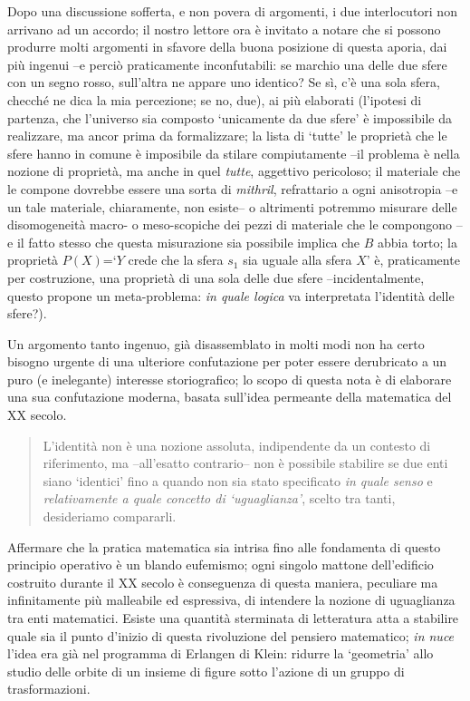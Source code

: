 Dopo una discussione sofferta, e non povera di argomenti, i due interlocutori non arrivano ad un accordo; il nostro lettore ora è invitato a notare che si possono produrre molti argomenti in sfavore della buona posizione di questa aporia, dai più ingenui --e perciò praticamente inconfutabili: se marchio una delle due sfere con un segno rosso, sull'altra ne appare uno identico? Se sì, c'è una sola sfera, checché ne dica la mia percezione; se no, due), ai più elaborati (l'ipotesi di partenza, che l'universo sia composto `unicamente da due sfere' è impossibile da realizzare, ma ancor prima da formalizzare; la lista di `tutte' le proprietà che le sfere hanno in comune è imposibile da stilare compiutamente --il problema è nella nozione di proprietà, ma anche in quel \emph{tutte}, aggettivo pericoloso; il materiale che le compone dovrebbe essere una sorta di \emph{mithril}, refrattario a ogni anisotropia --e un tale materiale, chiaramente, non esiste-- o altrimenti potremmo misurare delle disomogeneità macro- o meso-scopiche dei pezzi di materiale che le compongono --e il fatto stesso che questa misurazione sia possibile implica che $B$ abbia torto; la proprietà $P(X)$=`$Y$ crede che la sfera $s_1$ sia uguale alla sfera $X$' è, praticamente per costruzione, una proprietà di una sola delle due sfere --incidentalmente, questo propone un meta-problema: \emph{in quale logica} va interpretata l'identità delle sfere?).

Un argomento tanto ingenuo, già disassemblato in molti modi \cite{foobar,baz} non ha certo bisogno urgente di una ulteriore confutazione per poter essere derubricato a un puro (e inelegante) interesse storiografico; lo scopo di questa nota è di elaborare una sua confutazione moderna, basata sull'idea permeante della matematica del XX secolo.
\begin{quote}
  L'identità non è una nozione assoluta, indipendente da un contesto di riferimento, ma --all'esatto contrario-- non è possibile stabilire se due enti siano `identici' fino a quando non sia stato specificato \emph{in quale senso} e \emph{relativamente a quale concetto di `uguaglianza'}, scelto tra tanti, desideriamo compararli.
\end{quote}
Affermare che la pratica matematica sia intrisa fino alle fondamenta di questo principio operativo è un blando eufemismo; ogni singolo mattone dell'edificio costruito durante il XX secolo è conseguenza di questa maniera, peculiare ma infinitamente più malleabile ed espressiva, di intendere la nozione di uguaglianza tra enti matematici. Esiste una quantità sterminata di letteratura atta a stabilire quale sia il punto d'inizio di questa rivoluzione del pensiero matematico; \emph{in nuce} l'idea era già nel programma di Erlangen di Klein: ridurre la `geometria' allo studio delle orbite di un insieme di figure sotto l'azione di un gruppo di trasformazioni.


